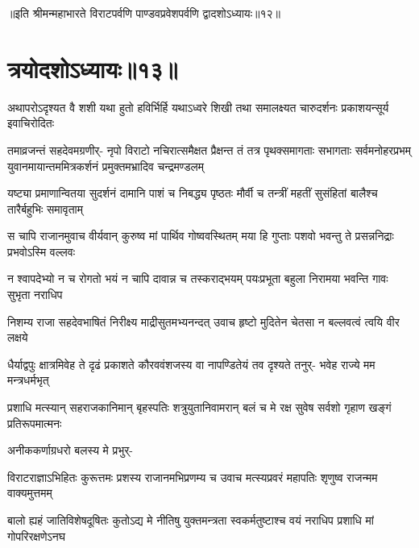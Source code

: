 ॥इति श्रीमन्महाभारते विराटपर्वणि पाण्डवप्रवेशपर्वणि द्वादशोऽध्यायः॥१२॥

\chapter{त्रयोदशोऽध्यायः॥१३॥}

\fourlineindentedshloka
{अथापरोऽदृश्यत वै शशी यथा}
{हुतो हविर्भिर्हि यथाऽध्वरे शिखी}
{तथा समालक्ष्यत चारुदर्शनः}
{प्रकाशयन्सूर्य इवाचिरोदितः}


\sixlineindentedshloka
{तमाव्रजन्तं सहदेवमग्रणीर्-}
{नृपो विराटो नचिरात्समैक्षत}
{प्रैक्षन्त तं तत्र पृथक्समागताः}
{सभागताः सर्वमनोहरप्रभम्}
{युवानमायान्तममित्रकर्शनं}
{प्रमुक्तमभ्रादिव चन्द्रमण्डलम्}


\fourlineindentedshloka
{यष्ट्या प्रमाणान्वितया सुदर्शनं}
{दामानि पाशं च निबद्ध्य पृष्ठतः}
{मौर्वी च तन्त्रीं महतीं सुसंहितां}
{बालैश्च तारैर्बहुभिः समावृताम्}


\fourlineindentedshloka
{स चापि राजानमुवाच वीर्यवान्}
{कुरुष्व मां पार्थिव गोष्ववस्थितम्}
{मया हि गुप्ताः पशवो भवन्तु ते}
{प्रसन्ननिद्राः प्रभवोऽस्मि वल्लवः}


\fourlineindentedshloka
{न श्वापदेभ्यो न च रोगतो भयं}
{न चापि दावान्न च तस्कराद्भयम्}
{पयःप्रभूता बहुला निरामया}
{भवन्ति गावः सुभृता नराधिप}


\fourlineindentedshloka
{निशम्य राजा सहदेवभाषितं}
{निरीक्ष्य माद्रीसुतमभ्यनन्दत्}
{उवाच हृष्टो मुदितेन चेतसा}
{न बल्लवत्वं त्वयि वीर लक्षये}


\fourlineindentedshloka
{धैर्याद्वपुः क्षात्रमिवेह ते दृढं}
{प्रकाशते कौरववंशजस्य वा}
{नापण्डितेयं तव दृश्यते तनुर्-}
{भवेह राज्ये मम मन्त्रधर्मभृत्}


\fourlineindentedshloka
{प्रशाधि मत्स्यान् सहराजकानिमान्}
{बृहस्पतिः शत्रुयुतानिवामरान्}
{बलं च मे रक्ष सुवेष सर्वशो}
{गृहाण खङ्गं प्रतिरूपमात्मनः}


{अनीककर्णाग्रधरो बलस्य मे प्रभुर्-\hspace{\shlokaspaceskip}}\\



\fourlineindentedshloka
{विराटराज्ञाऽभिहितः कुरूत्तमः}
{प्रशस्य राजानमभिप्रणम्य च}
{उवाच मत्स्यप्रवरं महापतिः}
{शृणुष्व राजन्मम वाक्यमुत्तमम्}


\fourlineindentedshloka
{बालो ह्यहं जातिविशेषदूषितः}
{कुतोऽद्य मे नीतिषु युक्तमन्त्रता}
{स्वकर्मतुष्टाश्च वयं नराधिप}
{प्रशाधि मां गोपरिरक्षणेऽनघ}


